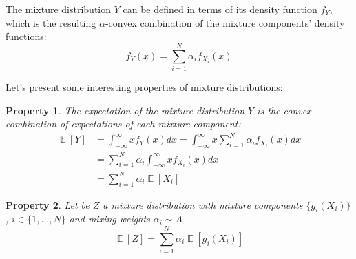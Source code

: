 \documentclass[12pt,a4paper,openright,twoside]{article}
\DeclareMathOperator*{\E}{\mathbb{E}}
\numberwithin{equation}{section}
\theoremstyle{definition}
\theoremstyle{remark}
\theoremstyle{plain}
\newtheorem{mixtureProperty}{Property}
\begin{document}
The mixture distribution $Y$ can be defined in terms of its density function $f_Y$, which is the resulting $\alpha$-convex combination of the mixture components' density functions:
\begin{equation} \label{mixtureDef}
    f_{Y} (x) = \sum_{i=1}^{N} \alpha _i f_{X_i}(x)
\end{equation}

Let's present some interesting properties of mixture distributions:

\begin{mixtureProperty} \label{mixtureProperty1}
	The expectation of the mixture distribution $Y$ is the convex combination of expectations of each mixture component: 
    \begin{equation} \label{mixtureProperty1eq}
    \begin{split}
        \E [Y] &= \int_{-\infty}^{\infty} x f_{Y}(x) dx = \int_{-\infty}^{\infty} x \sum_{i=1}^{N} \alpha_i f_{X_i}(x) dx \\
        &= \sum_{i=1}^{N} \alpha_i \int_{-\infty}^{\infty} x f_{X_i}(x) dx \\
        &= \sum_{i=1}^{N} \alpha_i \E [X_i]
    \end{split}
    \end{equation}
\end{mixtureProperty}


\begin{mixtureProperty} \label{mixtureProperty2}
	Let be $Z$ a mixture distribution with mixture components $\{g_i(X_i)\}$, $i\in \{1, \dots, N\}$ and mixing weights $\alpha_i \sim A$
    \begin{equation} \label{mixtureProperty2eq}
        \E [Z] = \sum_{i=1}^{N} \alpha_i \E [g_i(X_i)]
    \end{equation}
\end{mixtureProperty}
\end{document}
